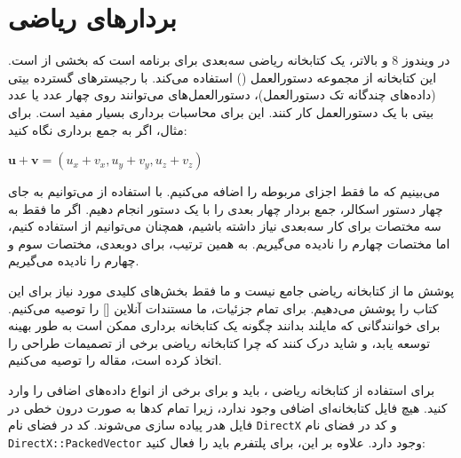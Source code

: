 \section{\textbf{بردار‌های ریاضی }}
\label{sec:1.6}
{
    \Large
    \begin{spacing}{1.5}
        در ویندوز 8 و بالاتر،  یک کتابخانه ریاضی سه‌بعدی برای برنامه  است که بخشی از  است.
        این کتابخانه از مجموعه دستورالعمل  () استفاده می‌کند.
        با رجیسترهای  گسترده  بیتی (داده‌های چندگانه تک دستورالعمل)، دستورالعمل‌های  می‌توانند روی چهار عدد  یا عدد   بیتی با یک دستورالعمل کار کنند.
        این برای محاسبات برداری بسیار مفید است. برای مثال، اگر به جمع برداری نگاه کنید:

        \begin{center}
            $\textbf{u}+\textbf{v}=(u_{x}+v_{x},u_{y}+v_{y},u_{z}+v_{z})$
        \end{center}

        می‌بینیم که ما فقط اجزای مربوطه را اضافه می‌کنیم.
        با استفاده از  می‌توانیم به جای چهار دستور اسکالر، جمع بردار چهار بعدی را با یک دستور  انجام دهیم.
        اگر ما فقط به سه مختصات برای کار سه‌بعدی نیاز داشته باشیم، همچنان می‌توانیم از  استفاده کنیم، اما مختصات چهارم را نادیده می‌گیریم.
        به همین ترتیب، برای دو‌بعدی، مختصات سوم و چهارم را نادیده می‌گیریم.

        پوشش ما از کتابخانه ریاضی  جامع نیست و ما فقط بخش‌های کلیدی مورد نیاز برای این کتاب را پوشش می‌دهیم.
        برای تمام جزئیات، ما مستندات آنلاین [] را توصیه می‌کنیم.
        برای خوانندگانی که مایلند بدانند چگونه یک کتابخانه برداری  ممکن است به طور بهینه توسعه یابد، و شاید درک کنند که چرا کتابخانه ریاضی  برخی از تصمیمات طراحی را اتخاذ کرده است،
        مقاله  را توصیه می‌کنیم.

        برای استفاده از کتابخانه ریاضی ، باید  و برای برخی از انواع داده‌های اضافی  را وارد کنید.
        هیچ فایل کتابخانه‌ای اضافی وجود ندارد، زیرا تمام کدها به صورت درون خطی در فایل هدر پیاده سازی می‌شوند.
        کد  در فضای نام \texttt{DirectX} و کد  در فضای نام \texttt{DirectX::PackedVector} وجود دارد.
        علاوه بر این، برای پلتفرم  باید  را فعال کنید:


\end{spacing}}
